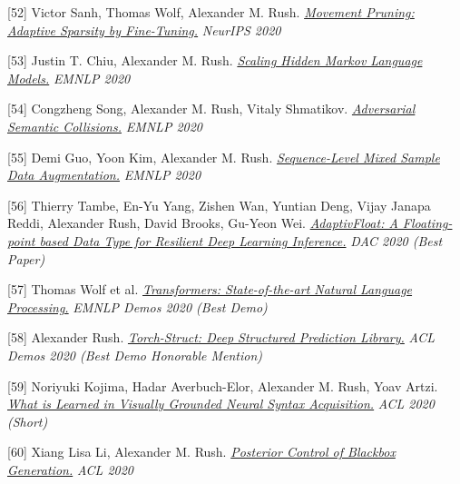 \documentclass[10pt]{article}
\begin{document}
\medskip


[52] \ind Victor Sanh, Thomas Wolf, Alexander M. Rush. \emph{\href{ https://arxiv.org/pdf/2005.07683 }{ Movement Pruning: Adaptive Sparsity by Fine-Tuning.} }\emph{ NeurIPS 2020 }

\medskip


[53] \ind Justin T. Chiu, Alexander M. Rush. \emph{\href{ https://arxiv.org/abs/2011.04640 }{ Scaling Hidden Markov Language Models.} }\emph{ EMNLP 2020 }

\medskip


[54] \ind Congzheng Song, Alexander M. Rush, Vitaly Shmatikov. \emph{\href{ https://www.cs.cornell.edu/~shmat/shmat_emnlp20.pdf }{ Adversarial Semantic Collisions.} }\emph{ EMNLP 2020 }

\medskip


[55] \ind Demi Guo, Yoon Kim, Alexander M. Rush. \emph{\href{ https://www.aclweb.org/anthology/2020.emnlp-main.447/ }{ Sequence-Level Mixed Sample Data Augmentation.} }\emph{ EMNLP 2020 }

\medskip


[56] \ind Thierry Tambe, En-Yu Yang, Zishen Wan, Yuntian Deng, Vijay Janapa Reddi, Alexander Rush, David Brooks, Gu-Yeon Wei. \emph{\href{ https://arxiv.org/pdf/1909.13271 }{ AdaptivFloat: A Floating-point based Data Type for Resilient Deep Learning Inference.} }\emph{ DAC 2020 (Best Paper) }

\medskip


[57] \ind Thomas Wolf et al. \emph{\href{ https://arxiv.org/pdf/1910.03771 }{ Transformers: State-of-the-art Natural Language Processing.} }\emph{ EMNLP Demos 2020 (Best Demo) }

\medskip


[58] \ind Alexander Rush. \emph{\href{ https://arxiv.org/pdf/2002.00876 }{ Torch-Struct: Deep Structured Prediction Library.} }\emph{ ACL Demos 2020 (Best Demo Honorable Mention) }

\medskip


[59] \ind Noriyuki Kojima, Hadar Averbuch-Elor, Alexander M. Rush, Yoav Artzi. \emph{\href{ https://arxiv.org/pdf/2005.01678 }{ What is Learned in Visually Grounded Neural Syntax Acquisition.} }\emph{ ACL 2020  (Short) }

\medskip


[60] \ind Xiang Lisa Li, Alexander M. Rush. \emph{\href{ https://arxiv.org/pdf/2005.04560 }{ Posterior Control of Blackbox Generation.} }\emph{ ACL 2020 }

\medskip
\end{document}
